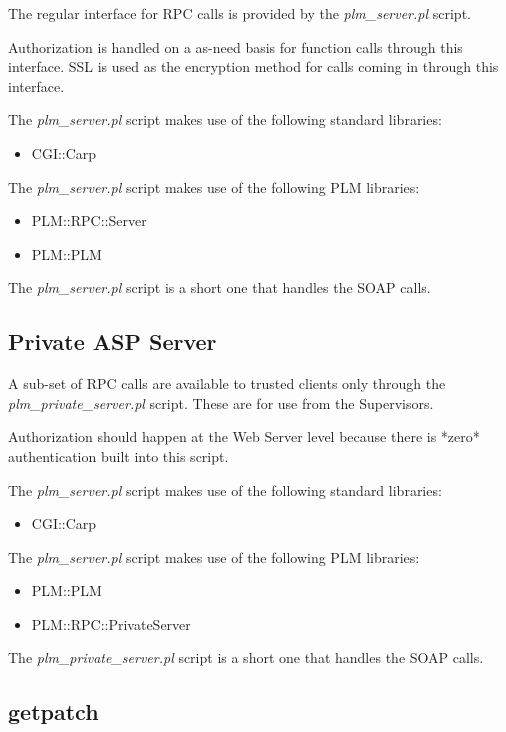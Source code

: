 The regular interface for RPC calls is provided by the \emph{plm\_server.pl} script.

Authorization is handled on a as-need basis for function calls through this interface.
SSL is used as the encryption method for calls coming in through this interface.

The \emph{plm\_server.pl} script makes use of the following standard libraries:
\begin{itemize}
\item CGI::Carp
\end{itemize}

The \emph{plm\_server.pl} script makes use of the following PLM libraries:
\begin{itemize}
\item PLM::RPC::Server
\item PLM::PLM
\end{itemize}

The \emph{plm\_server.pl} script is a short one that
handles the SOAP calls.

\subsection{Private ASP Server}

A sub-set of RPC calls are available to trusted clients 
only through the \emph{plm\_private\_server.pl} script.  These are for use from the Supervisors.

Authorization should happen at the Web Server level because there is *zero* 
authentication built into this script.

The \emph{plm\_server.pl} script makes use of the following standard libraries:
\begin{itemize}
\item CGI::Carp
\end{itemize}

The \emph{plm\_server.pl} script makes use of the following PLM libraries:
\begin{itemize}
\item PLM::PLM
\item PLM::RPC::PrivateServer
\end{itemize}

The \emph{plm\_private\_server.pl} script is a short one that 
handles the SOAP calls.

\subsection{getpatch}

